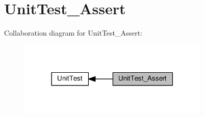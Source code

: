 \hypertarget{group__unit_test___assert}{}\section{Unit\+Test\+\_\+\+Assert}
\label{group__unit_test___assert}
Collaboration diagram for Unit\+Test\+\_\+\+Assert\+:\nopagebreak
\begin{figure}[H]
\begin{center}
\leavevmode
\includegraphics[width=258pt]{d5/d7f/group__unit_test___assert}
\end{center}
\end{figure}
